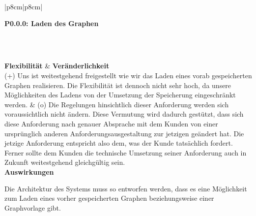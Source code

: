 \documentclass[enabledeprecatedfontcommands,fontsize=11pt,paper=a4,twoside]{scrartcl}
\newcounter{one}
\newcounter{two}[one]
\newcounter{three}[two]
\newcommand{\tone}{0\theone}
\newcommand{\ttwo}{0\thetwo}
\newcommand{\three}{\stepcounter{three}0\thethree}
\begin{document}
\begin{tabular} {|p{8cm}|p{8cm}|}
	\hline
	 {\parbox{16cm}{\textbf{\hypertarget{w}{P\tone.\ttwo.\three}: Laden des Graphen}} }\\ \hline \hline
	\rule{0pt}{5ex}\\ [2ex] \hline
	\textbf{Flexibilität}  & \textbf{Veränderlichkeit} \\
	(+) Uns ist weitestgehend freigestellt wie wir das Laden eines vorab gespeicherten Graphen realisieren. Die Flexibilität ist dennoch nicht sehr hoch, da unsere Möglichkeiten des Ladens von der Umsetzung der Speicherung eingeschränkt werden. &
	(o) Die Regelungen hinsichtlich dieser Anforderung werden sich voraussichtlich nicht ändern. Diese Vermutung wird dadurch gestützt, dass sich diese Anforderung nach genauer Absprache mit dem Kunden von einer ursprünglich anderen Anforderungsausgestaltung zur jetzigen geändert hat. Die jetzige Anforderung entspricht also dem, was der Kunde tatsächlich fordert. Ferner sollte dem Kunden die technische Umsetzung seiner Anforderung auch in Zukunft weitestgehend gleichgültig sein. \\ \hline
	 {\textbf{Auswirkungen}} \\
	 {\parbox{16cm}{Die Architektur des Systems muss so entworfen werden, dass es eine Möglichkeit zum Laden eines vorher gespeicherten Graphen beziehungsweise einer Graphvorlage gibt.} }\\ \hline
\end{tabular}
\newpage
\end{document}
